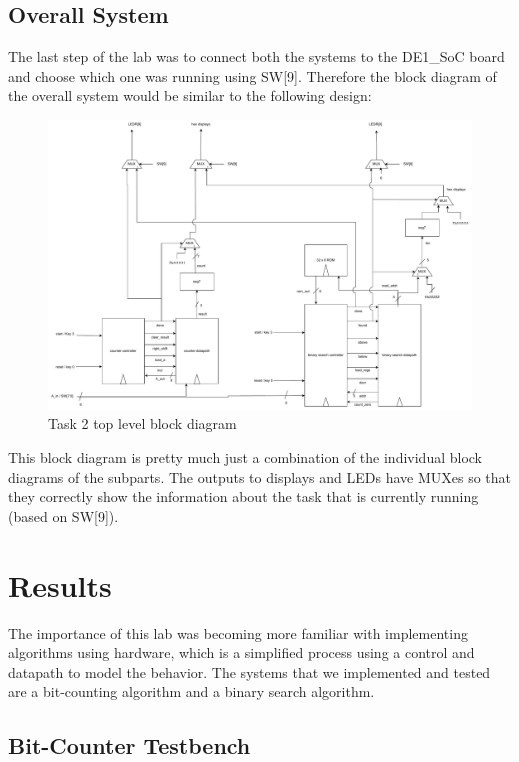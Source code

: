 \documentclass[11pt, titlepage]{article}
\begin{document}
        \subsection{Overall System}
            The last step of the lab was to connect both the systems to the DE1\_SoC board and choose which one was running using SW[9]. Therefore the block diagram of the overall system would be similar to the following design:
            
            \begin{figure}[H]
                \centering
                \includegraphics[scale=0.4]{Images/task 2 top level block diagram.pdf}
                \caption{Task 2 top level block diagram}
            \end{figure}

            This block diagram is pretty much just a combination of the individual block diagrams of the subparts. The outputs to displays and LEDs have MUXes so that they correctly show the information about the task that is currently running (based on SW[9]).
    \newpage
    \section{Results}
        The importance of this lab was becoming more familiar with implementing algorithms using hardware, which is a simplified process using a control and datapath to model the behavior. The systems that we implemented and tested are a bit-counting algorithm and a binary search algorithm. 

        \subsection{Bit-Counter Testbench}
            
\end{document}
